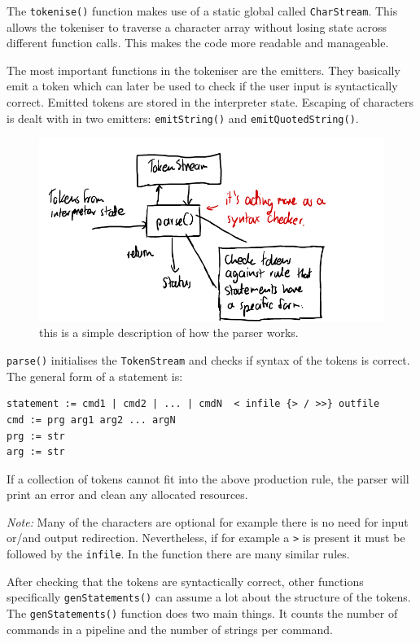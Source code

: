 \documentclass[12pt]{article}
\begin{document}
The \texttt{tokenise()} function makes use of a static global
called \texttt{CharStream}. This allows the tokeniser to
traverse a character array without losing state across different
function calls. This makes the code more readable and
manageable.

The most important functions in the tokeniser are the emitters.
They basically emit a token which can later be used to check if
the user input is syntactically correct. Emitted tokens are
stored in the interpreter state. Escaping of characters is dealt
with in two emitters: \texttt{emitString()} and
\texttt{emitQuotedString()}.

\begin{figure}[H]
\centering
\includegraphics{parser}
\caption{this is a simple description of how the
parser works.}
\end{figure}

\texttt{parse()} initialises the \texttt{TokenStream} and checks
if syntax of the tokens is correct. The general form of a
statement is:

\begin{verbatim}
statement := cmd1 | cmd2 | ... | cmdN  < infile {> / >>} outfile
cmd := prg arg1 arg2 ... argN
prg := str
arg := str
\end{verbatim}

If a collection of tokens cannot fit into the above
production rule, the parser will print an error and clean any
allocated resources.

\textit{Note:} Many of the characters are optional for example
there is no need for input or/and output redirection.
Nevertheless, if for example a \texttt{>} is present it must be
followed by the \texttt{infile}. In the function there are many
similar rules.

After checking that the tokens are syntactically correct, other
functions specifically \texttt{genStatements()} can assume a lot
about the structure of the tokens. The \texttt{genStatements()}
function does two main things. It counts the number of commands
in a pipeline and the number of strings per command.
\end{document}
